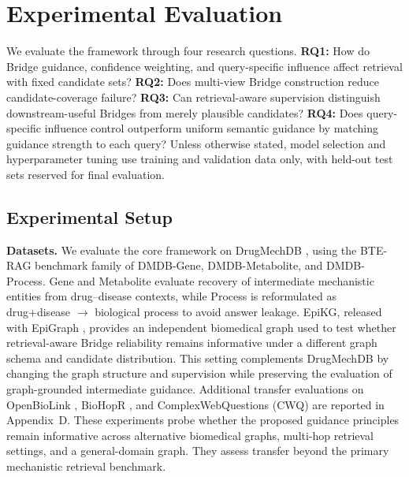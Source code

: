 \documentclass{article} %
\begin{document}
\section{Experimental Evaluation}
\label{sec:experiments}

We evaluate the framework through four research questions.
\textbf{RQ1:} How do Bridge guidance, confidence weighting, and
query-specific influence affect retrieval with fixed candidate sets?
\textbf{RQ2:} Does multi-view Bridge construction reduce candidate-coverage
failure?
\textbf{RQ3:} Can retrieval-aware supervision distinguish downstream-useful
Bridges from merely plausible candidates?
\textbf{RQ4:} Does query-specific influence control outperform uniform
semantic guidance by matching guidance strength to each query?
Unless otherwise stated, model selection and hyperparameter tuning use training
and validation data only, with held-out test sets reserved for final evaluation.

\subsection{Experimental Setup}
\label{sec:setup}

\textbf{Datasets.} We evaluate the core framework on DrugMechDB
\citep{gonzalez2023drugmechdb}, using the BTE-RAG benchmark family
\citep{joy2026bterag} of DMDB-Gene, DMDB-Metabolite, and DMDB-Process.
Gene and Metabolite evaluate recovery of intermediate mechanistic entities
from drug--disease contexts, while Process is reformulated as
drug+disease $\rightarrow$ biological process to avoid answer leakage.
EpiKG, released with EpiGraph \citep{dai2026epigraph}, provides an
independent biomedical graph used to test whether retrieval-aware Bridge
reliability remains informative under a different graph schema and candidate
distribution. This setting complements DrugMechDB by changing the graph
structure and supervision while preserving the evaluation of graph-grounded
intermediate guidance. Additional transfer evaluations on OpenBioLink
\citep{breit2020openbiolink}, BioHopR \citep{kim2025biohopr}, and
ComplexWebQuestions (CWQ) \citep{talmor2018web} are reported in
Appendix~D. These experiments probe whether the proposed guidance principles
remain informative across alternative biomedical graphs, multi-hop retrieval
settings, and a general-domain graph. They assess transfer beyond the primary mechanistic retrieval benchmark.
\end{document}
